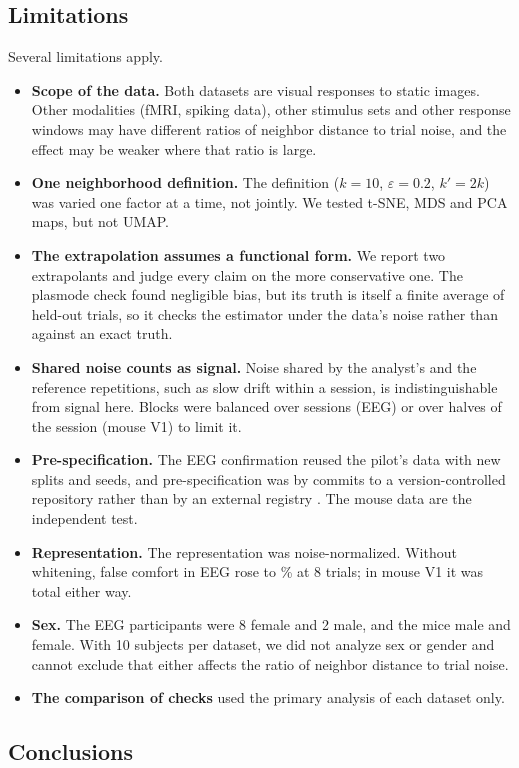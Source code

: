 

\subsection{Limitations}

Several limitations apply.
\begin{itemize}[leftmargin=*]
  \item \textbf{Scope of the data.} Both datasets are visual responses to static images. Other
  modalities (fMRI, spiking data), other stimulus sets and other response windows may have
  different ratios of neighbor distance to trial noise, and the effect may be weaker where that
  ratio is large.
  \item \textbf{One neighborhood definition.} The definition ($k=10$, $\varepsilon=0.2$,
  $k'=2k$) was varied one factor at a time, not jointly. We tested t-SNE, MDS and PCA maps, but not
  UMAP.
  \item \textbf{The extrapolation assumes a functional form.} We report two extrapolants and judge
  every claim on the more conservative one. The plasmode check found negligible bias, but its truth
  is itself a finite average of held-out trials, so it checks the estimator under the data's noise
  rather than against an exact truth.
  \item \textbf{Shared noise counts as signal.} Noise shared by the analyst's and the reference
  repetitions, such as slow drift within a session, is indistinguishable from signal here. Blocks
  were balanced over sessions (EEG) or over halves of the session (mouse V1) to limit it.
  \item \textbf{Pre-specification.} The EEG confirmation reused the pilot's data with new splits
  and seeds, and pre-specification was by commits to a version-controlled repository rather than
  by an external registry \citep{nosek2018}. The mouse data are the independent test.
  \item \textbf{Representation.} The representation was noise-normalized. Without whitening,
  false comfort in EEG rose to \EegUnwhitenedFC\% at 8 trials; in mouse V1 it was total either way.
  \item \textbf{Sex.} The EEG participants were 8 female and 2 male, and the mice \MouseMale{} male
  and \MouseFemale{} female. With 10 subjects per dataset, we did not analyze sex or gender and
  cannot exclude that either affects the ratio of neighbor distance to trial noise.
  \item \textbf{The comparison of checks} used the primary analysis of each dataset only.
\end{itemize}

\subsection{Conclusions}



